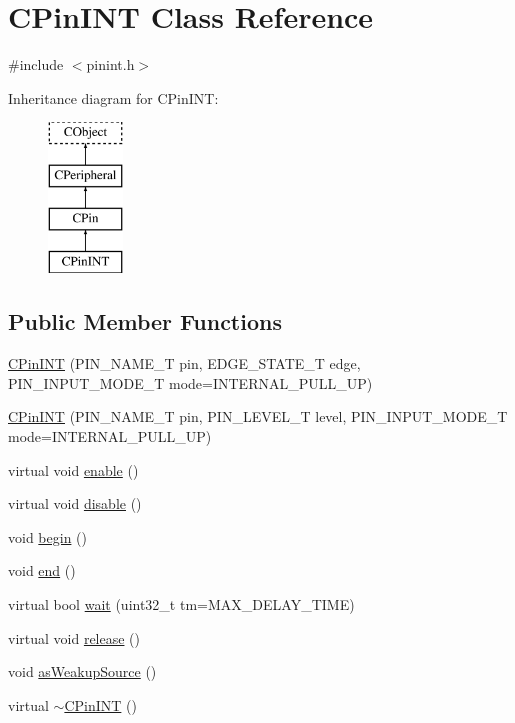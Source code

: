 \hypertarget{class_c_pin_i_n_t}{\section{C\-Pin\-I\-N\-T Class Reference}
\label{class_c_pin_i_n_t}
}


{\ttfamily \#include $<$pinint.\-h$>$}

Inheritance diagram for C\-Pin\-I\-N\-T\-:\begin{figure}[H]
\begin{center}
\leavevmode
\includegraphics[height=4.000000cm]{db/d2c/class_c_pin_i_n_t}
\end{center}
\end{figure}
\subsection*{Public Member Functions}
\begin{DoxyCompactItemize}
\item 
\hyperlink{class_c_pin_i_n_t_a71f5452b1d99597b04082bf402f4ae59}{C\-Pin\-I\-N\-T} (P\-I\-N\-\_\-\-N\-A\-M\-E\-\_\-\-T pin, E\-D\-G\-E\-\_\-\-S\-T\-A\-T\-E\-\_\-\-T edge, P\-I\-N\-\_\-\-I\-N\-P\-U\-T\-\_\-\-M\-O\-D\-E\-\_\-\-T mode=I\-N\-T\-E\-R\-N\-A\-L\-\_\-\-P\-U\-L\-L\-\_\-\-U\-P)
\item 
\hyperlink{class_c_pin_i_n_t_a48e6afdca1e70de51e292d1d3c4bafc5}{C\-Pin\-I\-N\-T} (P\-I\-N\-\_\-\-N\-A\-M\-E\-\_\-\-T pin, P\-I\-N\-\_\-\-L\-E\-V\-E\-L\-\_\-\-T level, P\-I\-N\-\_\-\-I\-N\-P\-U\-T\-\_\-\-M\-O\-D\-E\-\_\-\-T mode=I\-N\-T\-E\-R\-N\-A\-L\-\_\-\-P\-U\-L\-L\-\_\-\-U\-P)
\item 
virtual void \hyperlink{class_c_pin_i_n_t_a36d2301b10290741be6d3dd86dbc534b}{enable} ()
\item 
virtual void \hyperlink{class_c_pin_i_n_t_a08521d6d6892b7a80452bfce7db03e2b}{disable} ()
\item 
void \hyperlink{class_c_pin_i_n_t_a811526191ebf7ba17f0f51dea004d37b}{begin} ()
\item 
void \hyperlink{class_c_pin_i_n_t_a9f65ac4a7485b63e46b232f8d7ab385f}{end} ()
\item 
virtual bool \hyperlink{class_c_pin_i_n_t_a45e9fb4b6e6300e4c1c2ed6c13cfc062}{wait} (uint32\-\_\-t tm=M\-A\-X\-\_\-\-D\-E\-L\-A\-Y\-\_\-\-T\-I\-M\-E)
\item 
virtual void \hyperlink{class_c_pin_i_n_t_abe0ce7ac090423e11d460e75c8838128}{release} ()
\item 
void \hyperlink{class_c_pin_i_n_t_ae30634b8f9107d2ce4b6c3a52aeb380a}{as\-Weakup\-Source} ()
\item 
virtual \hyperlink{class_c_pin_i_n_t_ab75df389802ed381ac35726196ee15bb}{$\sim$\-C\-Pin\-I\-N\-T} ()
\end{DoxyCompactItemize}
